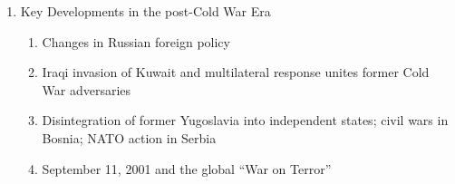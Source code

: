 \documentclass[12pt]{article}
\begin{document}
\begin{enumerate}
      \item Key Developments in the post-Cold War Era

        \begin{enumerate}

          \item Changes in Russian foreign policy

          \item Iraqi invasion of Kuwait and multilateral response unites former Cold War adversaries

          \item Disintegration of former Yugoslavia into independent states; civil wars in Bosnia; NATO action in Serbia

          \item September 11, 2001 and the global “War on Terror”

        \end{enumerate}

    \end{enumerate}
\end{document}
